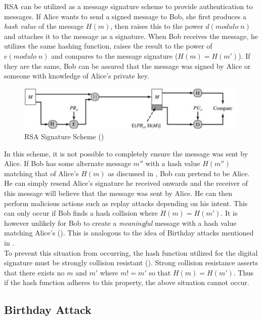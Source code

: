 \documentclass[]{article}
\begin{document}
RSA can be utilized as a message signature scheme to provide authentication to messages. If Alice wants to send a signed message to Bob, she first produces a \textit{hash value} of the message $H(m)$, then raises this to the power $d(modulo\;n)$ and attaches it to the message as a signature. When Bob receives the message, he utilizes the same hashing function, raises the result to the power of $e(modulo\;n)$ and compares to the message signature ($H(m)=H(m')$). If they are the same, Bob can be assured that the message was signed by Alice or someone with knowledge of Alice's private key.\\

\begin{figure}[H]
	\centering
	\includegraphics[height=\textheight/7,width=12cm]{rsasignature.png}
	\caption{RSA Signature Scheme (\cite{alttext})}
\end{figure}

\noindent
In this scheme, it is not possible to completely ensure the message was sent by Alice. If Bob has some alternate message $m''$ with a hash value $H(m'')$ matching that of Alice's $H(m)$ as discussed in \cite{RSA}, Bob can pretend to be Alice. He can simply resend Alice's signature he received onwards and the receiver of this message will believe that the message was sent by Alice. He can then perform malicious actions such as replay attacks depending on his intent. This can only occur if Bob finds a hash collision where $H(m)=H(m')$. It is however unlikely for Bob to create a \textit{meaningful} message with a hash value matching Alice's (\cite{alttext}). This is analogous to the idea of Birthday attacks mentioned in \cite{lecture3}.\\

\noindent
To prevent this situation from occurring, the hash function utilized for the digital signature must be strongly collision resistant (\cite{RSA}). Strong collision resistance asserts that there exists no $m$ and $m'$ where $m!=m'$ so that $H(m)=H(m')$. Thus if the hash function adheres to this property, the above situation cannot occur.

\break
\subsection*{Birthday Attack}
\end{document}
